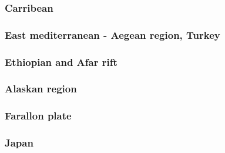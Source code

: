 \subsubsection*{Carribean} 

\subsubsection*{East mediterranean - Aegean region, Turkey} 

\cite{cazf10}

\subsubsection*{Ethiopian and Afar rift} 

\cite{mitk07}
\cite{cort08}
\cite{kekj09}
\cite{beve10}
\cite{phcs14}
\cite{brcr17}
\cite{brcg17}
\cite{cocf19}

\subsubsection*{Alaskan region} 

\cite{jabi12}
\cite{jabr13}
\cite{haja17}
\cite{mimo18}

\subsubsection*{Farallon plate} 

\cite{lisg08}

\subsubsection*{Japan} 

\cite{kigk14}


